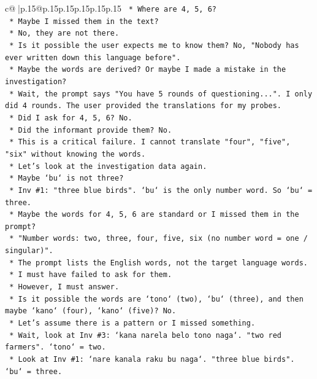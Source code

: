 \documentclass{article}
\begin{document}
{\begin{supertabular}{c@{$\;$}|p{.15\linewidth}@{}p{.15\linewidth}p{.15\linewidth}p{.15\linewidth}p{.15\linewidth}p{.15\linewidth}}
{{{\texttt{        *   Where are 4, 5, 6?} \\
\texttt{        *   Maybe I missed them in the text?} \\
\texttt{        *   No, they are not there.} \\
\texttt{        *   Is it possible the user expects me to know them? No, "Nobody has ever written down this language before".} \\
\texttt{        *   Maybe the words are derived? Or maybe I made a mistake in the investigation?} \\
\texttt{        *   Wait, the prompt says "You have 5 rounds of questioning...". I only did 4 rounds. The user provided the translations for my probes.} \\
\texttt{        *   Did I ask for 4, 5, 6? No.} \\
\texttt{        *   Did the informant provide them? No.} \\
\texttt{        *   This is a critical failure. I cannot translate "four", "five", "six" without knowing the words.} \\
\texttt{        *   Let's look at the investigation data again.} \\
\texttt{        *   Maybe `bu` is not three?} \\
\texttt{        *   Inv \#1: "three blue birds". `bu` is the only number word. So `bu` = three.} \\
\texttt{        *   Maybe the words for 4, 5, 6 are standard or I missed them in the prompt?} \\
\texttt{        *   "Number words: two, three, four, five, six (no number word = one / singular)".} \\
\texttt{        *   The prompt lists the English words, not the target language words.} \\
\texttt{        *   I must have failed to ask for them.} \\
\texttt{        *   However, I must answer.} \\
\texttt{        *   Is it possible the words are `tono` (two), `bu` (three), and then maybe `kano` (four), `kano` (five)? No.} \\
\texttt{        *   Let's assume there is a pattern or I missed something.} \\
\texttt{        *   Wait, look at Inv \#3: `kana narela belo tono naga`. "two red farmers". `tono` = two.} \\
\texttt{        *   Look at Inv \#1: `nare kanala raku bu naga`. "three blue birds". `bu` = three.} \\
}}}
\end{supertabular}}
\end{document}
